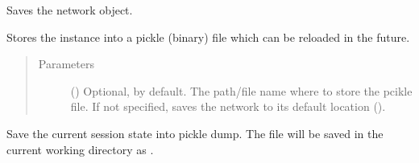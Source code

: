 \documentclass[letterpaper,10pt,english]{sphinxmanual}
\begin{document}
\begin{fulllineitems}

\begin{fulllineitems}
\label{\detokenize{reference:pypath.main.PyPath.remove_undirected}}
\end{fulllineitems}


\begin{fulllineitems}
\label{\detokenize{reference:pypath.main.PyPath.run_batch}}
\end{fulllineitems}


\begin{fulllineitems}
\label{\detokenize{reference:pypath.main.PyPath.save_network}}
Saves the network object.

Stores the instance into a pickle (binary) file which can be
reloaded in the future.
\begin{quote}\begin{description}
\item[{Parameters}] \leavevmode
{} () \textendash{} Optional,  by default. The path/file name where to
store the pcikle file. If not specified, saves the network
to its default location
().

\end{description}\end{quote}

\end{fulllineitems}


\begin{fulllineitems}
\label{\detokenize{reference:pypath.main.PyPath.save_session}}
Save the current session state into pickle dump. The file will
be saved in the current working directory as
.


\end{fulllineitems}
\end{fulllineitems}
\end{document}
